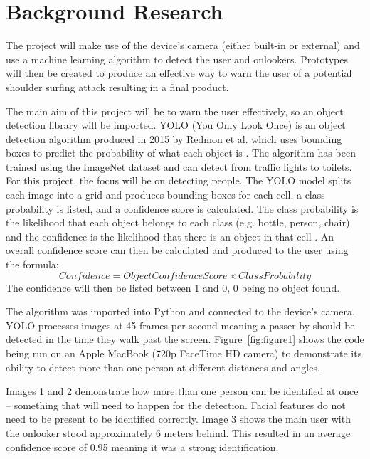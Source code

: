 \documentclass[12pt]{article}
\theoremstyle{plain}
\theoremstyle{definition}
\begin{document}
\section{Background Research}  
\label{sec:background} 

The project will make use of the device’s camera (either built-in or external) and use a machine learning algorithm to detect the user and onlookers. Prototypes will then be created to produce an effective way to warn the user of a potential shoulder surfing attack resulting in a final product.

The main aim of this project will be to warn the user effectively, so an object detection library will be imported. YOLO (You Only Look Once) is an object detection algorithm produced in 2015 by Redmon et al. which uses bounding boxes to predict the probability of what each object is \cite{redmon_you_2016}. The algorithm has been trained using the ImageNet dataset \cite{noauthor_imagenet_nodate} and can detect from traffic lights to toilets. For this project, the focus will be on detecting people. The YOLO model splits each image into a grid and produces bounding boxes for each cell, a class probability is listed, and a confidence score is calculated. The class probability is the likelihood that each object belongs to each class (e.g. bottle, person, chair) and the confidence is the likelihood that there is an object in that cell \cite{redmon_you_2016}. An overall confidence score can then be calculated and produced to the user using the formula: 
\[
  Confidence = Object Confidence Score \times Class Probability
\]
The confidence will then be listed between 1 and 0, 0 being no object found.

The algorithm was imported into Python and connected to the device’s camera. YOLO processes images at 45 frames per second \cite{redmon_you_2016} meaning a passer-by should be detected in the time they walk past the screen. Figure~\ref{fig:figure1} shows the code being run on an Apple MacBook (720p FaceTime HD camera) to demonstrate its ability to detect more than one person at different distances and angles.

Images 1 and 2 demonstrate how more than one person can be identified at once – something that will need to happen for the detection. Facial features do not need to be present to be identified correctly. Image 3 shows the main user with the onlooker stood approximately 6 meters behind. This resulted in an average confidence score of 0.95 meaning it was a strong identification.
\end{document}
